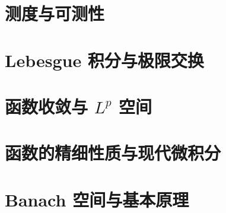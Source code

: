 \documentclass[UTF8,zihao=-4,openany,fontset=fandol]{ctexbook}
\begin{document}
\part{测度与可测性}






\part{Lebesgue 积分与极限交换}






\part{函数收敛与 \texorpdfstring{\(L^p\)}{Lp} 空间}







\part{函数的精细性质与现代微积分}






\part{Banach 空间与基本原理}





\end{document}
